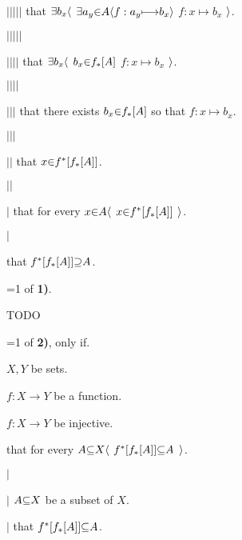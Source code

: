 $|$\hs$|$\hs$|$\hs$|$\hs$|$\hs {} that $\a\exists b_x \a\langle$ $\a\exists a_y \p\in A \a\langle f: a_y \mapsto b_x \a\rangle$  $f: x \mapsto b_x$ $\a\rangle$. \par
$|$\hs$|$\hs$|$\hs$|$\hs$|$\hs \par

$|$\hs$|$\hs$|$\hs$|$\hs {} that $\a\exists b_x \a\langle$ $b_x \p\in f_*[\g A]$  $f: x \mapsto b_x$ $\a\rangle$. \par
$|$\hs$|$\hs$|$\hs$|$\hs \par

$|$\hs$|$\hs$|$\hs {} that there exists $b_x \p\in f_*[\g A]$ so that $f: x \mapsto b_x$. \par
$|$\hs$|$\hs$|$\hs \par

$|$\hs$|$\hs {} that $x \p\in f^*[f_*[\g A]]$. \par
$|$\hs$|$\hs \par

$|$\hs {} that for every $x \p\in \g A \a\langle$ $x \p\in f^*[f_*[\g A]]$ $\a\rangle$. \par
$|$\hs \par

 that $f^*[f_*[\g A]] \p\supseteq \g A$. \par
\fi

=1
\vs
{} of {\bf 1)}. \par
TODO
\fi

=1
\vs
{} of {\bf 2)}, only if. \par
{} $X,Y$ be sets. \par
{} $f: X \to Y$ be a function. \par
{} $f: X \to Y$ be injective. \par
{} that for every $\g A \p\subseteq X \a\langle$ $f^*[f_*[\g A]] \p\subseteq \g A$ $\a\rangle$.

  $|$\hs \par
  $|$\hs {} $\g A \p\subseteq X$ be a subset of $X$. \par
  $|$\hs {} that $f^*[f_*[\g A]] \p\subseteq \g A$. \par


